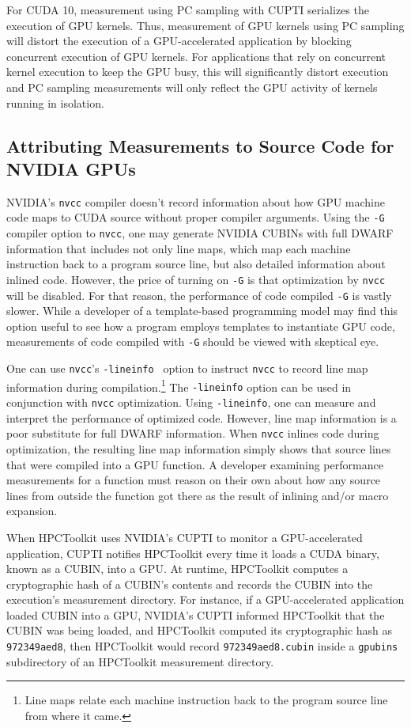 For CUDA 10, measurement using PC sampling with CUPTI serializes the execution of GPU kernels. Thus, measurement of GPU kernels using PC sampling will distort the execution of a GPU-accelerated application by blocking concurrent execution of GPU kernels. For applications that rely on concurrent kernel execution to keep the GPU busy, this will significantly distort execution and PC sampling measurements will only reflect the GPU activity of kernels running in isolation.




\subsection{Attributing Measurements to Source Code for NVIDIA GPUs}

NVIDIA's {\tt nvcc} compiler doesn't record information about how GPU machine code maps to CUDA source without proper compiler arguments. Using the {\tt -G} compiler option to {\tt nvcc}, one may generate NVIDIA CUBINs with full DWARF information that includes not only line maps, which map each machine instruction back to a program source line, but also detailed information about inlined code. However, the price of turning on {\tt -G} is that optimization by {\tt nvcc} will be disabled. For that reason, the performance of code compiled {\tt -G} is vastly slower. While a developer of a template-based programming model may find this option useful to see how a program employs templates to instantiate GPU code, measurements of code compiled with {\tt -G} should be viewed with skeptical eye.

One can use {\tt nvcc}'s {\tt -lineinfo } option to instruct {\tt nvcc} to record line map information during compilation.\footnote{Line maps relate each machine instruction back to the program source line from where it came.} The {\tt -lineinfo} option can be used in conjunction with {\tt nvcc} optimization. Using {\tt -lineinfo}, one can measure and interpret the performance of optimized code. However, line map information is a poor substitute for full DWARF information. When {\tt nvcc} inlines code during optimization, the resulting line map information simply shows that source lines that were compiled into a GPU function. A developer examining performance measurements for a function must reason on their own about how any source lines from outside the function got there as the result of inlining and/or macro expansion.

When HPCToolkit uses NVIDIA's CUPTI to monitor a GPU-accelerated application, 
CUPTI notifies HPCToolkit every time it loads a CUDA binary, known as a CUBIN, into a GPU.
At runtime, HPCToolkit computes a cryptographic hash of a CUBIN's contents and records the CUBIN into the execution's measurement directory. 
For instance, if a GPU-accelerated application loaded CUBIN into a GPU, NVIDIA's CUPTI informed HPCToolkit that the CUBIN was being loaded, and HPCToolkit computed its cryptographic hash as {\tt 972349aed8}, then HPCToolkit would record {\tt 972349aed8.cubin} inside a {\tt gpubins} subdirectory of an HPCToolkit measurement directory.

